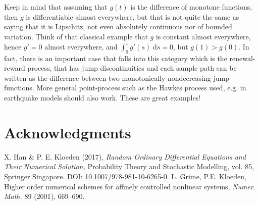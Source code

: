 \documentclass[reqno,12pt]{amsart}
\theoremstyle{plain}%
\theoremstyle{definition}
\newcommand{\dontshow}[1]{}
\begin{document}
Keep in mind that assuming that $g(t)$ is the difference of monotone functions, then $g$ is differentiable almost everywhere, but that is not quite the same as saying that it is Lipschitz, not even absolutely continuous nor of bounded variation. Think of that classical example that $g$ is constant almost everywhere, hence $g' = 0$ almost everywhere, and $\int_0^1 g'(s) \;\mathrm{d}s = 0$, but $g(1) > g(0)$. In fact, there is an important case that falls into this category which is the renewal-reward process, that has jump discontinuities and each sample path can be written as the difference between two monotonically nondecreasing jump functions. More general point-process such as the Hawkes process used, e.g. in earthquake models should also work. These are great examples!

\dontshow{For the power function $t \mapsto t^\theta$, for $t \geq 0$, with $0<\theta\leq 1$, we have, for $t > s \geq 0$,
\begin{align*}
    \frac{|t^{\theta} - s^{\theta}|}{|t - s|^\theta} = \frac{\left|1 - \left(\frac{s}{t}\right)^\theta\right|}{\left|1 - \left(\frac{s}{t}\right)\right|^\theta} \leq \frac{\left|1 - \left(\frac{s}{t}\right)\right|}{\left|1 - \left(\frac{s}{t}\right)\right|} = 1,
\end{align*}
where we used that $(s/t)^\theta \geq (s/t)$, since $0 \leq s/t < 1$ and $0 < \theta \leq 1$, and, similarly, that $(1 - s/t)^\theta \geq (1 - s/t)$. This shows that $t \mapsto t^\theta$ is H\"older continuous with H\"older exponent $\theta$ and H\"older constant $1$.
}


\section*{Acknowledgments}


\begin{thebibliography}{25}
   X. Han \& P. E. Kloeden (2017), \emph{Random Ordinary Differential Equations and Their Numerical Solution,} Probability Theory and Stochastic Modelling, vol. 85, Springer Singapore. \href{https://link.springer.com/book/10.1007/978-981-10-6265-0}{DOI: 10.1007/978-981-10-6265-0}.
   L. Gr\"une, P.E. Kloeden, Higher order numerical schemes for affinely controlled nonlinear systems, \emph{Numer. Math.} 89 (2001), 669--690.
\end{thebibliography}
\end{document}
